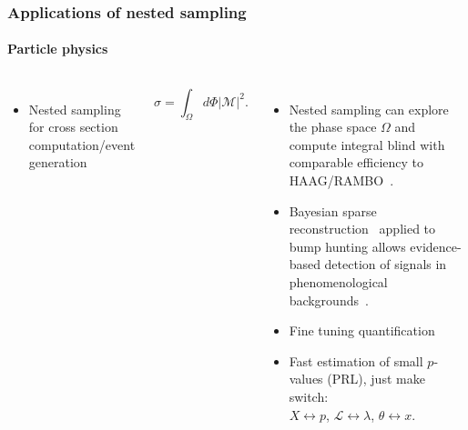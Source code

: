 \documentclass[aspectratio=169]{beamer}
\begin{document}
\begin{frame}
    \frametitle{Applications of nested sampling}
    \framesubtitle{Particle physics}
    \begin{columns}
        \begin{columns}
            \begin{itemize}
                \item Nested sampling for cross section computation/event generation
            \end{itemize}
            \[\sigma = \int_\Omega d\Phi |\mathcal{M}|^2.\]
        \end{columns}
        \begin{itemize}
            \item Nested sampling can explore the phase space $\Omega$ and compute integral blind with comparable efficiency to HAAG/RAMBO~.
            \item Bayesian sparse reconstruction~ applied to bump hunting allows evidence-based detection of signals in phenomenological backgrounds~.
            \item Fine tuning quantification
            \item Fast estimation of small $p$-values (PRL), just make switch:\\ $X\leftrightarrow p$, $\mathcal{L}\leftrightarrow\lambda$, $\theta \leftrightarrow x$.
        \end{itemize}

\end{columns}
\end{frame}
\end{document}
